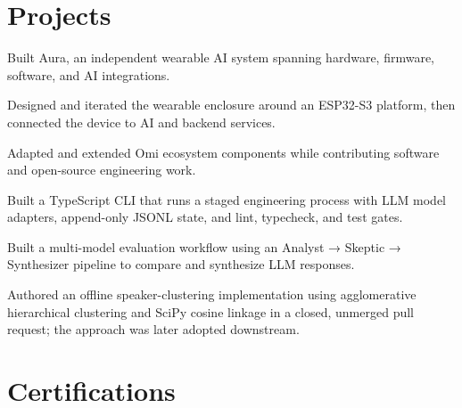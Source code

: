 \documentclass{../../templates/1/resume}
\begin{document}
\section{Projects}
\begin{resumeitemize}
\item Built Aura, an independent wearable AI system spanning hardware, firmware, software, and AI integrations.
\item Designed and iterated the wearable enclosure around an ESP32-S3 platform, then connected the device to AI and backend services.
\item Adapted and extended Omi ecosystem components while contributing software and open-source engineering work.
\end{resumeitemize}
\begin{resumeitemize}
\item Built a TypeScript CLI that runs a staged engineering process with LLM model adapters, append-only JSONL state, and lint, typecheck, and test gates.
\end{resumeitemize}
\begin{resumeitemize}
\item Built a multi-model evaluation workflow using an Analyst → Skeptic → Synthesizer pipeline to compare and synthesize LLM responses.
\end{resumeitemize}
\begin{resumeitemize}
\item Authored an offline speaker-clustering implementation using agglomerative hierarchical clustering and SciPy cosine linkage in a closed, unmerged pull request; the approach was later adopted downstream.
\end{resumeitemize}
\section{Certifications}
\end{document}
